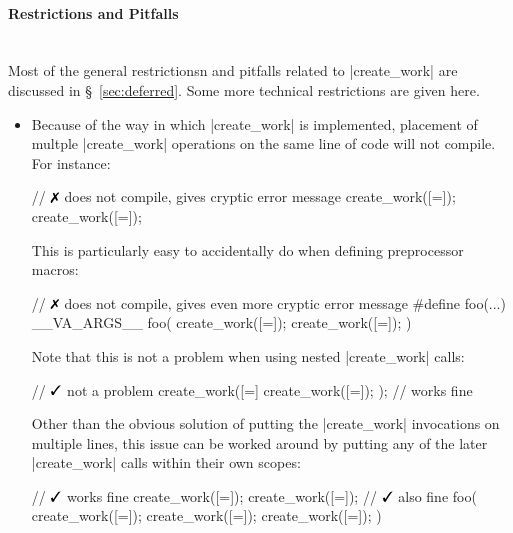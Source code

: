 \paragraph{Restrictions and Pitfalls}\mbox{} \\
Most of the general restrictionsn and pitfalls related to |create_work|
are discussed in \S~\ref{sec:deferred}.  Some more technical restrictions are
given here.
\begin{itemize}
  \item Because of the way in which |create_work| is implemented, placement of
  multple |create_work| operations on the same line of code will not compile. 
  For instance:
  \begin{CppCode}
// $\no$ does not compile, gives cryptic error message
create_work([=]{}); create_work([=]{}); 
  \end{CppCode}
  This is particularly easy to accidentally do when defining preprocessor
  macros:
  \begin{CppCode}
// $\no$ does not compile, gives even more cryptic error message
#define foo(...) __VA_ARGS__
foo(
  create_work([=]{}); 
  create_work([=]{}); 
)
  \end{CppCode}
  Note that this is not a problem when using nested |create_work| calls:
  \begin{CppCode}
// $\yes$ not a problem
create_work([=]{ create_work([=]{}); }); // works fine
  \end{CppCode}
  Other than the obvious solution of putting the |create_work| invocations on
  multiple lines, this issue can be worked around by putting any of the later
  |create_work| calls within their own scopes:
  \begin{CppCode}
// $\yes$ works fine
create_work([=]{}); { create_work([=]{}); }
// $\yes$ also fine
foo(
  create_work([=]{}); 
  { create_work([=]{}); }
  { create_work([=]{}); }
)
  \end{CppCode}
\end{itemize}


